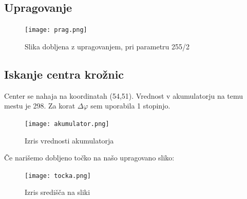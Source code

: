 \documentclass[12pt,a4paper]{article}
\begin{document}
\subsection{Upragovanje}
\begin{figure}[h!]
  \begin{center}
    \texttt{[image: prag.png]}
    \caption{Slika dobljena z upragovanjem, pri parametru 255/2}
    \label{fig:}
  \end{center}
\end{figure}
\pagebreak
\pagebreak
\subsection{Iskanje centra krožnic}
Center se nahaja na koordinatah (54,51). Vrednost v akumulatorju na temu mestu je 298. Za korat $\Delta \varphi$ sem uporabila 1 stopinjo. 
\begin{figure}[h!]
  \begin{center}
    \texttt{[image: akumulator.png]}
    \caption{Izris vrednosti akumulatorja}
    \label{fig:}
  \end{center}
\end{figure}

Če narišemo dobljeno točko na našo upragovano sliko:
\begin{figure}[h!]
  \begin{center}
    \texttt{[image: tocka.png]}
    \caption{Izris središča na sliki}
    \label{fig:}
  \end{center}
\end{figure}
\end{document}
